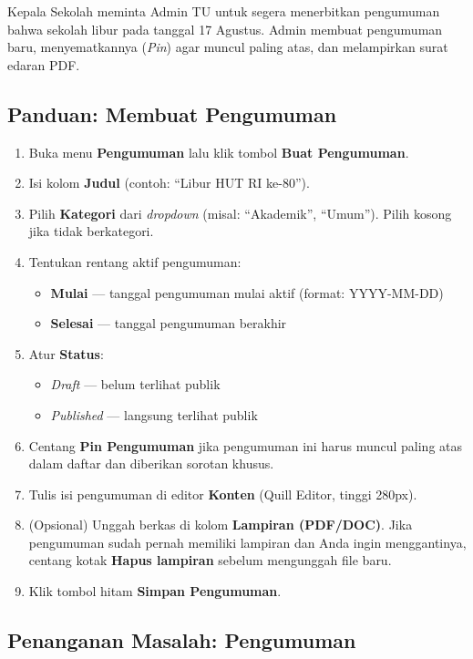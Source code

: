 Kepala Sekolah meminta Admin TU untuk segera menerbitkan pengumuman bahwa sekolah
libur pada tanggal 17 Agustus. Admin membuat pengumuman baru, menyematkannya
(\textit{Pin}) agar muncul paling atas, dan melampirkan surat edaran PDF.

\subsection{Panduan: Membuat Pengumuman}

\begin{enumerate}
  \item Buka menu \textbf{Pengumuman} lalu klik tombol \textbf{Buat Pengumuman}.
  \item Isi kolom \textbf{Judul} (contoh: ``Libur HUT RI ke-80'').
  \item Pilih \textbf{Kategori} dari \textit{dropdown} (misal: ``Akademik'', ``Umum'').
        Pilih kosong jika tidak berkategori.
  \item Tentukan rentang aktif pengumuman:
        \begin{itemize}
          \item \textbf{Mulai} --- tanggal pengumuman mulai aktif (format: YYYY-MM-DD)
          \item \textbf{Selesai} --- tanggal pengumuman berakhir
        \end{itemize}
  \item Atur \textbf{Status}:
        \begin{itemize}
          \item \textit{Draft} --- belum terlihat publik
          \item \textit{Published} --- langsung terlihat publik
        \end{itemize}
  \item Centang \textbf{Pin Pengumuman} jika pengumuman ini harus muncul paling
        atas dalam daftar dan diberikan sorotan khusus.
  \item Tulis isi pengumuman di editor \textbf{Konten} (Quill Editor, tinggi 280px).
  \item (Opsional) Unggah berkas di kolom \textbf{Lampiran (PDF/DOC)}.
        Jika pengumuman sudah pernah memiliki lampiran dan Anda ingin menggantinya,
        centang kotak \textbf{Hapus lampiran} sebelum mengunggah file baru.
  \item Klik tombol hitam \textbf{Simpan Pengumuman}.
\end{enumerate}

\subsection{Penanganan Masalah: Pengumuman}

